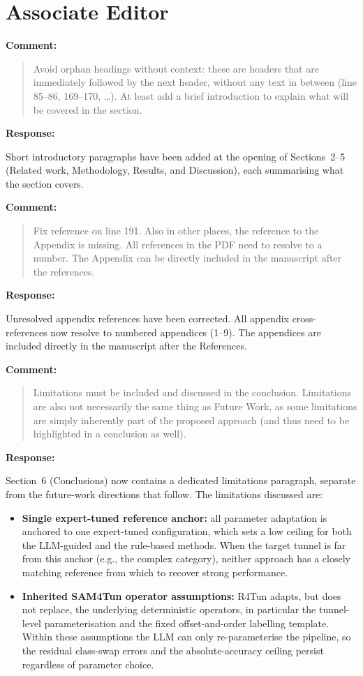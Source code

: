 \documentclass[11pt,a4paper]{article}
\newenvironment{commentblock}{%
  \par\smallskip\noindent\textbf{Comment:}\par
  \begin{quote}\itshape\color{black}
}{%
  \end{quote}\smallskip
}
\newenvironment{responseblock}{%
  \par\smallskip\noindent\textbf{Response:}\par
  \begingroup\color{responsegreen}
}{%
  \endgroup\smallskip
}
\begin{document}
\section*{Associate Editor}

\begin{commentblock}
Avoid orphan headings without context: these are headers that are immediately followed by the next header, without any text in between (line 85--86, 169--170, \ldots). At least add a brief introduction to explain what will be covered in the section.
\end{commentblock}
\begin{responseblock}
Short introductory paragraphs have been added at the opening of Sections~2--5 (Related work, Methodology, Results, and Discussion), each summarising what the section covers.
\end{responseblock}

\begin{commentblock}
Fix reference on line 191. Also in other places, the reference to the Appendix is missing. All references in the PDF need to resolve to a number. The Appendix can be directly included in the manuscript after the references.
\end{commentblock}
\begin{responseblock}
Unresolved appendix references have been corrected. All appendix cross-references now resolve to numbered appendices (1--9). The appendices are included directly in the manuscript after the References.
\end{responseblock}

\begin{commentblock}
Limitations must be included and discussed in the conclusion. Limitations are also not necessarily the same thing as Future Work, as some limitations are simply inherently part of the proposed approach (and thus need to be highlighted in a conclusion as well).
\end{commentblock}


\begin{responseblock}
Section~6 (Conclusions) now contains a dedicated limitations paragraph, separate from the future-work directions that follow. The limitations discussed are:
\begin{itemize}[nosep]
  \item \textbf{Single expert-tuned reference anchor:} all parameter adaptation is anchored to one expert-tuned configuration, which sets a low ceiling for both the LLM-guided and the rule-based methods. When the target tunnel is far from this anchor (e.g., the complex category), neither approach has a closely matching reference from which to recover strong performance.
  \item \textbf{Inherited SAM4Tun operator assumptions:} R4Tun adapts, but does not replace, the underlying deterministic operators, in particular the tunnel-level parameterisation and the fixed offset-and-order labelling template. Within these assumptions the LLM can only re-parameterise the pipeline, so the residual class-swap errors and the absolute-accuracy ceiling persist regardless of parameter choice.
\end{itemize}
\end{responseblock}
\end{document}
